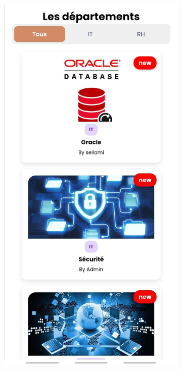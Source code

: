 \documentclass{article}
\begin{document}
\begin{figure}[H]
  \centering
  \begin{subfigure}[t]{0.3\textwidth}
    \centering
    \includegraphics[width=\textwidth]{picre6.jpg}

\end{subfigure}
\end{figure}
\end{document}
